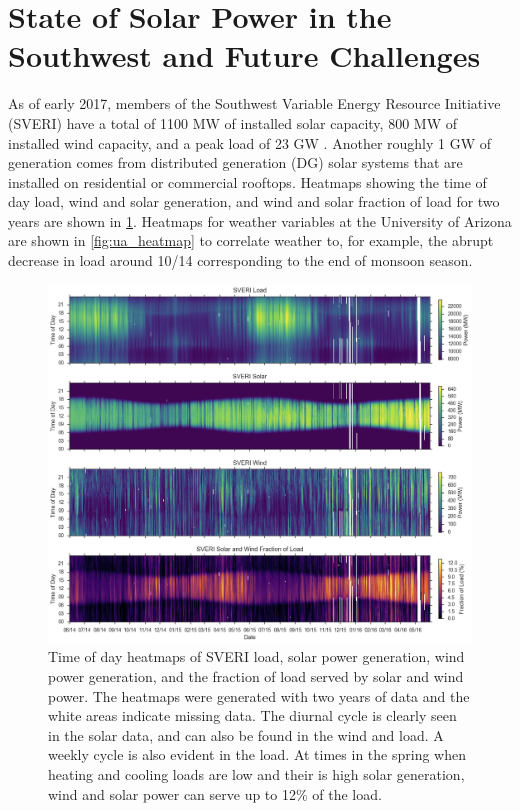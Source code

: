\section{State of Solar Power in the Southwest and Future Challenges}

As of early 2017, members of the Southwest Variable Energy Resource
Initiative (SVERI) have a total of 1100 MW of installed solar capacity,
800 MW of installed wind capacity, and a peak load of 23 GW
\citep{sveri_website}.
Another roughly 1 GW of generation comes from distributed generation
(DG) solar systems that are installed on residential or commercial
rooftops.
Heatmaps showing the time of day load, wind and solar generation, and
wind and solar fraction of load for two years are shown in
\cref{fig:sveri_heatmap}.
Heatmaps for weather variables at the University of Arizona are shown
in \cref{fig:ua_heatmap} to correlate weather to, for example, the
abrupt decrease in load around 10/14 corresponding to the end of monsoon season.

\begin{figure}[p]
\centering
\includegraphics[width=\textwidth]{figs/sveri_heat.png}
\caption[Heatmaps of SVERI load, solar power, wind power, and
renewable load fraction]{Time of day heatmaps of SVERI load, solar
  power generation, wind power generation, and the fraction of load
  served by solar and wind power. The heatmaps were generated with two
  years of data and the white areas indicate missing data. The diurnal
  cycle is clearly seen in the solar data, and can also be found in
  the wind and load. A weekly cycle is also evident in the load. At
  times in the spring when heating and cooling loads are low and their
  is high solar generation, wind and solar power can serve up to 12\%
  of the load.}
\label{fig:sveri_heatmap}
\end{figure}

